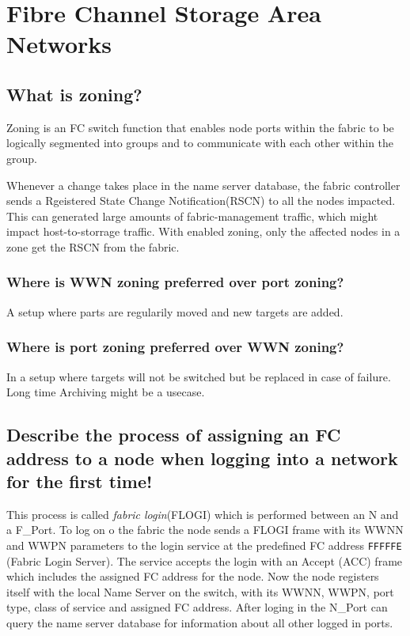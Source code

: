 \section{Fibre Channel Storage Area Networks} %
\label{sec:fibre_channel_storage_area_networks}

\subsection{What is zoning?} %
\label{sub:what_is_zoning}
	Zoning is an FC switch function
	that enables node ports within the fabric to be logically segmented
	into groups and to communicate with each other within the group.

	Whenever a change takes place in the name server database,
	the fabric controller sends a Rgeistered State Change Notification(RSCN)
	to all the nodes impacted.
	This can generated large amounts of fabric-management traffic,
	which might impact host-to-storrage traffic.
	With enabled zoning,
	only the affected nodes in a zone get the RSCN from the fabric.

\subsubsection{Where is WWN zoning preferred over port zoning?} %
\label{ssub:where_is_wwn_zoning_preferred_over_port_zoning}
	A setup where parts are regularily moved
	and new targets are added.

\subsubsection{Where is port zoning preferred over WWN zoning?} %
\label{ssub:where_is_port_zoning_preferred_over_wwn_zoning}
	In a setup where targets will not be switched
	but be replaced in case of failure.
	Long time Archiving might be a usecase.	

\subsection{Describe the process of assigning an FC address to a node when logging into a network for the first time!} %
\label{sub:describe_the_process_of_assigning_an_fc_address_to_a_node_when_logging_into_a_network_for_the_first_time}
	This process is called \emph{fabric login}(FLOGI) which is performed between an N and a F_Port.
	To log on o the fabric the node sends a FLOGI frame with its WWNN and WWPN parameters
	to the login service at the predefined FC address \texttt{FFFFFE} (Fabric Login Server).
	The service accepts the login with an Accept (ACC) frame
	which includes the assigned FC address for the node.
	Now the node registers itself with the local Name Server on the switch,
	with its WWNN, WWPN, port type, class of service and assigned FC address.
	After loging in the N_Port can query the name server database for information
	about all other logged in ports.

